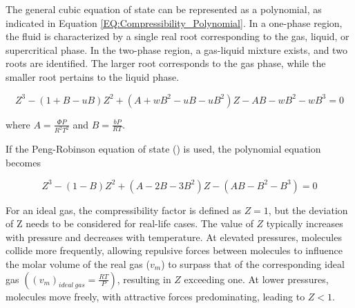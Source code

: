 \documentclass[../Article_Model_Parameters.tex]{subfiles}
\begin{document}
	\begin{table}[h!]
		\centering
		\caption{Parameters for Popular Cubic EoS}
		\label{tab:Popular_Cubic_EoS_alpha}
	\end{table}
	
	The general cubic equation of state can be represented as a polynomial, as indicated in Equation \ref{EQ:Compressibility_Polynomial}. In a one-phase region, the fluid is characterized by a single real root corresponding to the gas, liquid, or supercritical phase. In the two-phase region, a gas-liquid mixture exists, and two roots are identified. The larger root corresponds to the gas phase, while the smaller root pertains to the liquid phase.
	
	{\footnotesize
		\begin{equation}
			\label{EQ:Compressibility_Polynomial}
			Z^3 - (1+B-uB)Z^2+(A+wB^2-uB-uB^2)Z - AB - wB^2 - wB^3 = 0
	\end{equation} }
	
	where $A=\frac{\Phi P}{R^2T^2}$ and $B=\frac{bP}{RT}$.
	
	If the Peng-Robinson equation of state (\citet{Peng1976}) is used, the polynomial equation becomes
	
	{\footnotesize
		\begin{equation}
			\label{EQ:Peng_Robinson_Polynomial}
			Z^3 - (1-B)Z^2+(A-2B-3B^2)Z -(AB-B^2-B^3) = 0
	\end{equation} }
	
	For an ideal gas, the compressibility factor is defined as $Z = 1$, but the deviation of Z needs to be considered for real-life cases. The value of $Z$ typically increases with pressure and decreases with temperature. At elevated pressures, molecules collide more frequently, allowing repulsive forces between molecules to influence the molar volume of the real gas ($v_m$) to surpass that of the corresponding ideal gas $\left( \left(v_m\right)_{ideal~gas} = \frac{RT}{P} \right)$, resulting in $Z$ exceeding one. At lower pressures, molecules move freely, with attractive forces predominating, leading to $Z < 1$.
	
\end{document}
